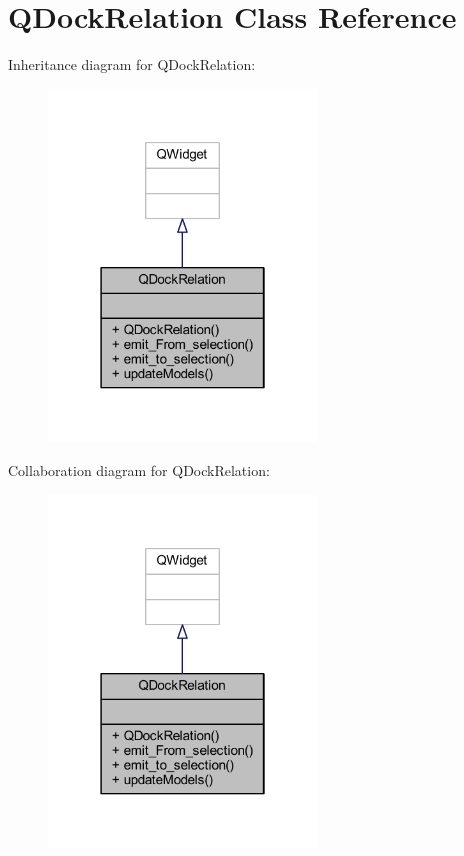\hypertarget{class_q_dock_relation}{}\section{Q\+Dock\+Relation Class Reference}
\label{class_q_dock_relation}


Inheritance diagram for Q\+Dock\+Relation\+:
\nopagebreak
\begin{figure}[H]
\begin{center}
\leavevmode
\includegraphics[width=202pt]{class_q_dock_relation__inherit__graph}
\end{center}
\end{figure}


Collaboration diagram for Q\+Dock\+Relation\+:
\nopagebreak
\begin{figure}[H]
\begin{center}
\leavevmode
\includegraphics[width=202pt]{class_q_dock_relation__coll__graph}
\end{center}
\end{figure}
